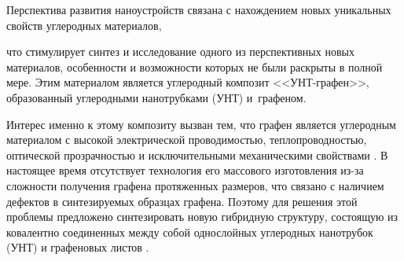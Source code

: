 




\renewcommand{\JournalDataOnline}{\displaydate{kolesnikovae}}




\makerutitle









Перспектива развития наноустройств связана с нахождением новых уникальных свойств углеродных материалов, 

что стимулирует синтез и исследование одного из перспективных новых материалов, особенности и возможности которых не были раскрыты в полной мере. Этим материалом является углеродный композит <<УНТ-графен>>, образованный углеродными нанотрубками (УНТ) и~графеном.



Интерес именно к этому композиту вызван тем, что графен является углеродным материалом с высокой электрической проводимостью, теплопроводностью, оптической прозрачностью и исключительными механическими свойствами \cite{kol:bib1}. В настоящее время отсутствует технология его массового изготовления из-за сложности получения графена протяженных размеров, что связано с наличием дефектов в синтезируемых образцах графена. Поэтому для решения этой проблемы предложено синтезировать новую гибридную структуру, состоящую из ковалентно соединенных между собой однослойных углеродных нанотрубок (УНТ) и графеновых листов \cite{kol:bib2}.



